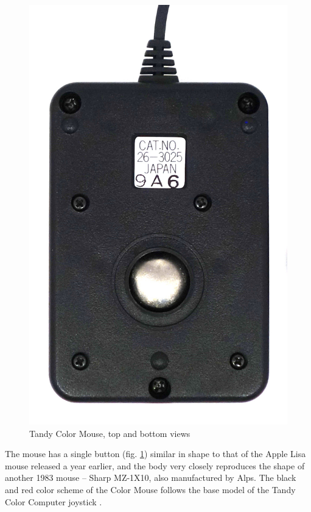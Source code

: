 \documentclass[11pt, a4paper]{article}
\begin{document}
\begin{figure}[h]
    \includegraphics[scale=0.55]{1984_tandy_trs80_color_mouse/bottom_60.jpg}
    \caption{Tandy Color Mouse, top and bottom views}
    \label{fig:TandyColorMouseTopAndBottom}
\end{figure}

The mouse has a single button (fig. \ref{fig:TandyColorMouseTopAndBottom}) similar in shape to that of the Apple Lisa mouse released a year earlier, and the body very closely reproduces the shape of another 1983 mouse -- Sharp MZ-1X10, also manufactured by Alps. The black and red color scheme of the Color Mouse follows the base model of the Tandy Color Computer joystick \cite{hierophant}.
\end{document}
